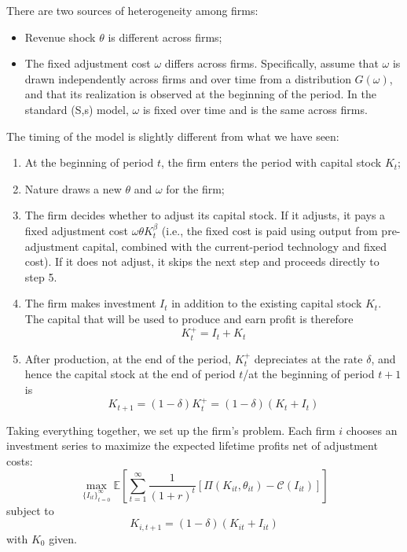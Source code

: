 \documentclass[12pt]{article}
\begin{document}
There are two sources of heterogeneity among firms:
\begin{itemize}
	\item Revenue shock $\theta$ is different across firms;
		\item The fixed adjustment cost $\omega$ differs across firms. Specifically, assume that $\omega$ is drawn independently across firms and over time from a distribution $G(\omega)$, and that its realization is observed at the beginning of the period. In the standard (S,s) model, $\omega$ is fixed over time and is the same across firms.
\end{itemize}

The timing of the model is slightly different from what we have seen:
\begin{enumerate}
	\item At the beginning of period $t$, the firm enters the period with capital stock $K_t$;
	\item Nature draws a new $\theta$ and $\omega$ for the firm; 
		\item The firm decides whether to adjust its capital stock. If it adjusts, it pays a fixed adjustment cost $\omega \theta K_t^\beta$ (i.e., the fixed cost is paid using output from pre-adjustment capital, combined with the current-period technology and fixed cost). If it does not adjust, it skips the next step and proceeds directly to step 5.  
	\item The firm makes investment $I_t$ in addition to the existing capital stock $K_t$. The capital that will be used to produce and earn profit is therefore
	\[K_{t}^+ = I_t + K_t\]
	\item After production, at the end of the period, $K_t^+$ depreciates at the rate $\delta$, and hence the capital stock at the end of period $t$/at the beginning of period $t+1$ is
	\begin{equation}
		K_{t+1} = (1-\delta) K_t^+ = (1-\delta) (K_t + I_t)
	\end{equation}
\end{enumerate}

Taking everything together, we set up the firm's problem. Each firm $i$ chooses an investment series to maximize the expected lifetime profits net of adjustment costs:
\begin{equation} \label{eq:obj}
	\max_{\{I_{it}\}_{t=0}^\infty} \mathbb{E} \left[\sum_{t=1}^\infty \frac{1}{(1+r)^t} [\Pi(K_{it}, \theta_{it}) - \mathcal{C}(I_{it})]\right]
\end{equation}
subject to
\begin{equation}
	K_{i,t+1} = (1-\delta) (K_{it} + I_{it})
\end{equation}
with $K_0$ given.
\end{document}
